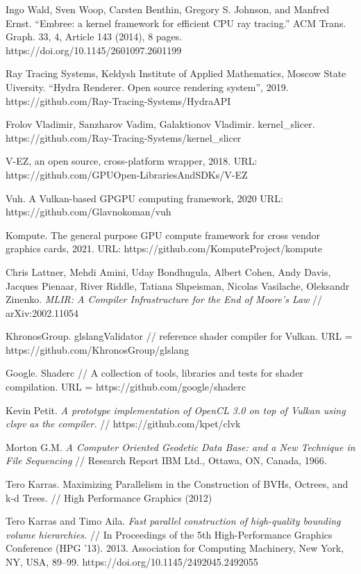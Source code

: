 \documentclass[11pt,fleqn,english,russian]{report} %
\begin{document}
\begin{thebibliography}{10}
	 Ingo Wald, Sven Woop, Carsten Benthin, Gregory S. Johnson, and Manfred Ernst. ``Embree: a kernel framework for efficient CPU ray tracing.'' ACM Trans. Graph. 33, 4, Article 143 (2014), 8 pages. https://doi.org/10.1145/2601097.2601199
	
	 Ray Tracing Systems, Keldysh Institute of Applied Mathematics, Moscow State Uiversity. ``Hydra Renderer. Open source rendering system'', 2019.
	https://github.com/Ray-Tracing-Systems/HydraAPI
	
	 Frolov Vladimir, Sanzharov Vadim, Galaktionov Vladimir. kernel\_slicer. https://github.com/Ray-Tracing-Systems/kernel\_slicer
	
	 V-EZ, an open source, cross-platform wrapper, 2018. URL: https://github.com/GPUOpen-LibrariesAndSDKs/V-EZ
	
	 Vuh. A Vulkan-based GPGPU computing framework, 2020 URL: https://github.com/Glavnokoman/vuh
	
	 Kompute. The general purpose GPU compute framework for cross vendor graphics cards, 2021. URL: https://github.com/KomputeProject/kompute
	
	 Chris Lattner, Mehdi Amini, Uday Bondhugula, Albert Cohen, Andy Davis, Jacques Pienaar, River Riddle, Tatiana Shpeisman, Nicolas Vasilache, Oleksandr Zinenko. \textit{MLIR: A Compiler Infrastructure for the End of Moore's Law} // arXiv:2002.11054
	
	 KhronosGroup. glslangValidator // reference shader compiler for Vulkan. URL = https://github.com/KhronosGroup/glslang
	
	 Google. Shaderc // A collection of tools, libraries and tests for shader compilation. URL = https://github.com/google/shaderc
	
	 Kevin Petit. \textit{A prototype implementation of OpenCL 3.0 on top of Vulkan using clspv as the compiler.} // https://github.com/kpet/clvk
	
	 Morton G.M. \textit{A Computer Oriented Geodetic Data Base: and a New Technique in File Sequencing} // Research Report IBM Ltd., Ottawa, ON, Canada, 1966.
	
	 Tero Karras. Maximizing Parallelism in the Construction of BVHs, Octrees, and k-d Trees. // High Performance Graphics (2012)
	
	 Tero Karras and Timo Aila. \textit{Fast parallel construction of high-quality bounding volume hierarchies.} // In Proceedings of the 5th High-Performance Graphics Conference (HPG '13). 2013. Association for Computing Machinery, New York, NY, USA, 89–99. https://doi.org/10.1145/2492045.2492055
	

\end{thebibliography}
\end{document}
